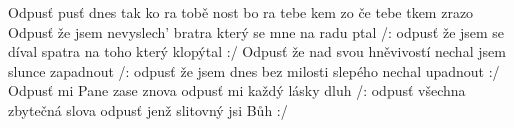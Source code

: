 \begin{TEXT}{Odpusť}
\SLOKA {}pusť dnes tak ko ra \NL
{} tobě nost bo \NL
{} ra \NL
{} tebe kem zo  \NL 
{} če \NL
{} tebe tkem zrazo
\SLOKA Odpusť že jsem nevyslech' bratra \NL
který se mne na radu ptal \NL
/: odpusť že jsem se díval spatra \NL
na toho který klopýtal :/ 
\SLOKA Odpusť že nad svou hněvivostí \NL
nechal jsem slunce zapadnout \NL
/: odpusť že jsem dnes bez milosti \NL
slepého nechal upadnout :/ 
\SLOKA Odpusť mi Pane zase znova \NL
odpusť mi každý lásky dluh \NL
/: odpusť všechna zbytečná slova \NL
odpusť jenž slitovný jsi Bůh :/ \NL
\end{TEXT}
